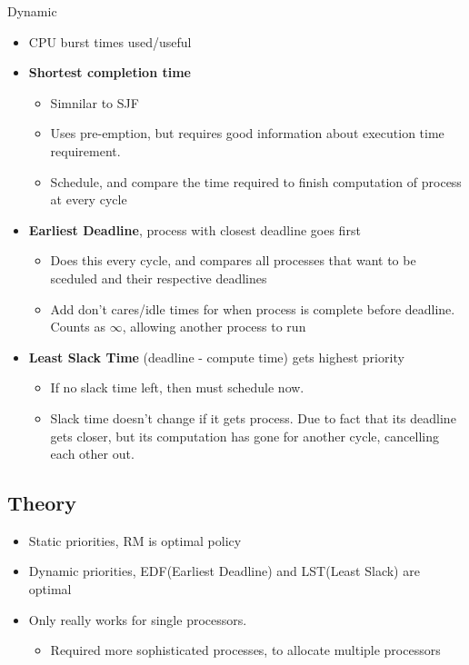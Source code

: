 \documentclass{article}
\begin{document}
		Dynamic
		\begin{itemize}
			\item CPU burst times used/useful
			\item \textbf{Shortest completion time}
			\begin{itemize}
				\item Simnilar to SJF
				\item Uses pre-emption, but requires good information about execution time requirement.
				\item Schedule, and compare the time required to finish computation of process at every cycle
			\end{itemize}
			\item \textbf{Earliest Deadline}, process with closest deadline goes first
			\begin{itemize}
				\item Does this every cycle, and compares all processes that want to be sceduled and their respective deadlines
				\item Add don't cares/idle times for when process is complete before deadline. Counts as $\infty$, allowing another process to run
			\end{itemize}
			\item \textbf{Least Slack Time} (deadline - compute time) gets highest priority
			\begin{itemize}
				\item If no slack time left, then must schedule now.
				\item Slack time doesn't change if it gets process. Due to fact that its deadline gets closer, but its computation has gone for another cycle, cancelling each other out.
			\end{itemize}
		\end{itemize}

	\subsection{Theory} 
		\begin{itemize}
			\item Static priorities, RM is optimal policy
			\item Dynamic priorities, EDF(Earliest Deadline) and LST(Least Slack) are optimal
			\item Only really works for single processors.
			\begin{itemize}
				\item Required more sophisticated processes, to allocate multiple processors
			\end{itemize}
		\end{itemize}
\end{document}
